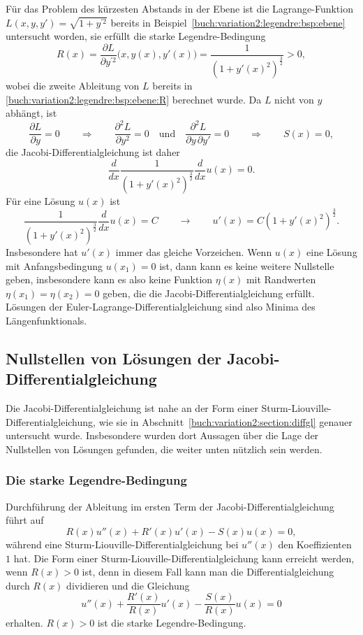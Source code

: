 \begin{beispiel}
Für das Problem des kürzesten Abstands in der Ebene ist
die Lagrange-Funktion $L(x,y,y')=\sqrt{1+y^{\prime 2}}$ bereits
in Beispiel~\ref{buch:variation2:legendre:bsp:ebene}
untersucht worden, sie erfüllt die starke Legendre-Bedingung
\[
R(x)
=
\frac{\partial L}{\partial y^{\prime 2}}\bigl(x,y(x),y'(x)\bigr)
=
\frac{1}{(1+y'(x)^2)^{\frac32}} > 0,
\]
wobei die zweite Ableitung von $L$ bereits in
\eqref{buch:variation2:legendre:bsp:ebene:R}
berechnet wurde.
Da $L$ nicht von $y$ abhängt, ist
\[
\frac{\partial L}{\partial y}=0
\qquad\Rightarrow\qquad
\frac{\partial^2L}{\partial y^2}=0
\quad\text{und}\quad
\frac{\partial^2L}{\partial y\,\partial y'}=0
\qquad\Rightarrow\qquad
S(x)=0,
\]
die Jacobi-Differentialgleichung ist daher
\begin{equation}
\frac{d}{dx} \frac{1}{(1+y'(x)^2)^{\frac32}} \frac{d}{dx} u(x) = 0.
\label{buch:variation2:jacobi:eqn:ebeneQ}
\end{equation}
Für eine Lösung $u(x)$ ist
\[
\frac{1}{(1+y'(x)^2)^{\frac32}}
\frac{d}{dx} u(x) = C
\qquad\rightarrow\qquad
u'(x)
=
C(1+y'(x)^2)^{\frac32}.
\]
Insbesondere hat $u'(x)$ immer das gleiche Vorzeichen.
Wenn $u(x)$ eine Lösung mit Anfangsbedingung $u(x_1)=0$ ist, dann
kann es keine weitere Nullstelle geben, insbesondere kann es
also keine Funktion $\eta(x)$ mit Randwerten $\eta(x_1)=\eta(x_2)=0$
geben, die die Jacobi-Differentialgleichung erfüllt.
Lösungen der Euler-Lagrange-Differentialgleichung sind also Minima
des Längenfunktionals.
\end{beispiel}

%
%
\subsection{Nullstellen von Lösungen der Jacobi-Differentialgleichung
\label{buch:variation2:jacobi:subection:nullstellen}}
Die Jacobi-Differentialgleichung ist nahe an der Form einer
Sturm-Liouville-Differential\-gleichung,
%
wie sie in Abschnitt~\ref{buch:variation2:section:diffgl} genauer
untersucht wurde.
Insbesondere wurden dort Aussagen über die Lage der Nullstellen von
Lösungen gefunden, die weiter unten nützlich sein werden.

%
%
\subsubsection{Die starke Legendre-Bedingung}
Durchführung der Ableitung im ersten Term der Jacobi-Differentialgleichung
führt auf
\[
R(x) u''(x) + R'(x) u'(x) - S(x) u(x) = 0,
\]
während eine Sturm-Liouville-Differentialgleichung bei $u''(x)$ den
Koeffizienten $1$ hat.
Die Form einer Sturm-Liouville-Differentialgleichung kann erreicht
werden, wenn $R(x)>0$ ist, denn in diesem Fall kann man die
Differentialgleichung durch $R(x)$ dividieren und die Gleichung
\[
u''(x) + \frac{R'(x)}{R(x)} u'(x) -\frac{S(x)}{R(x)} u(x) = 0
\]
erhalten.
$R(x)>0$ ist die starke Legendre-Bedingung.

